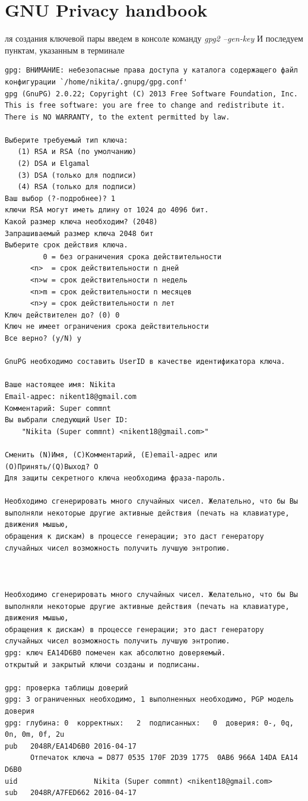 \documentclass[10pt,a4paper]{report}
\begin{document}
\section{GNU Privacy handbook}
ля создания ключевой пары введем в консоле команду \textit{gpg2 --gen-key} И последуем пунктам, указанным в терминале
\begin{verbatim}
gpg: ВНИМАНИЕ: небезопасные права доступа у каталога содержащего файл конфигурации `/home/nikita/.gnupg/gpg.conf'
gpg (GnuPG) 2.0.22; Copyright (C) 2013 Free Software Foundation, Inc.
This is free software: you are free to change and redistribute it.
There is NO WARRANTY, to the extent permitted by law.

Выберите требуемый тип ключа:
   (1) RSA и RSA (по умолчанию)
   (2) DSA и Elgamal
   (3) DSA (только для подписи)
   (4) RSA (только для подписи)
Ваш выбор (?-подробнее)? 1
ключи RSA могут иметь длину от 1024 до 4096 бит.
Какой размер ключа необходим? (2048) 
Запрашиваемый размер ключа 2048 бит
Выберите срок действия ключа.
         0 = без ограничения срока действительности
      <n>  = срок действительности n дней
      <n>w = срок действительности n недель
      <n>m = срок действительности n месяцев
      <n>y = срок действительности n лет
Ключ действителен до? (0) 0
Ключ не имеет ограничения срока действительности
Все верно? (y/N) y

GnuPG необходимо составить UserID в качестве идентификатора ключа.

Ваше настоящее имя: Nikita
Email-адрес: nikent18@gmail.com
Комментарий: Super commnt
Вы выбрали следующий User ID:
    "Nikita (Super commnt) <nikent18@gmail.com>"

Сменить (N)Имя, (C)Комментарий, (E)email-адрес или (O)Принять/(Q)Выход? O
Для защиты секретного ключа необходима фраза-пароль.

Необходимо сгенерировать много случайных чисел. Желательно, что бы Вы
выполняли некоторые другие активные действия (печать на клавиатуре, движения мышью,
обращения к дискам) в процессе генерации; это даст генератору
случайных чисел возможность получить лучшую энтропию.



Необходимо сгенерировать много случайных чисел. Желательно, что бы Вы
выполняли некоторые другие активные действия (печать на клавиатуре, движения мышью,
обращения к дискам) в процессе генерации; это даст генератору
случайных чисел возможность получить лучшую энтропию.
gpg: ключ EA14D6B0 помечен как абсолютно доверяемый.
открытый и закрытый ключи созданы и подписаны.

gpg: проверка таблицы доверий
gpg: 3 ограниченных необходимо, 1 выполненных необходимо, PGP модель доверия
gpg: глубина: 0  корректных:   2  подписанных:   0  доверия: 0-, 0q, 0n, 0m, 0f, 2u
pub   2048R/EA14D6B0 2016-04-17
      Отпечаток ключа = D877 0535 170F 2D39 1775  0AB6 966A 14DA EA14 D6B0
uid                  Nikita (Super commnt) <nikent18@gmail.com>
sub   2048R/A7FED662 2016-04-17
\end{verbatim}
\end{document}

